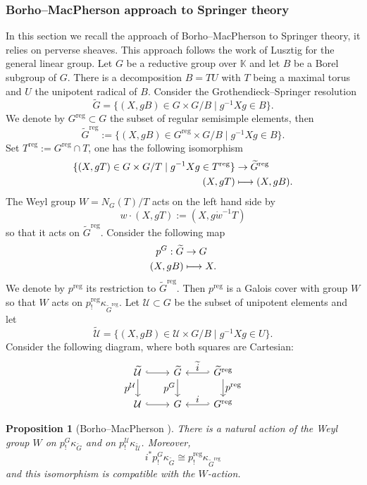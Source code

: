 \documentclass[JEP,XML,SOM,NoEqCountersInSection,Unicode,published]{cedram}
\let\ts\textstyle
\newcommand\mto{\mathchoice{\longmapsto}{\mapsto}{\mapsto}{\mapsto}}
\theoremstyle{definition}
\theoremstyle{plain}
\newtheorem{proposition}[definition]{Proposition}
\DeclareMathOperator{\reg}{reg}
\newcommand{\map}[5]{%
\begin{split}
#1: #2 & \to #3 \\
#4 & \mto #5
\end{split}%
}
\newcommand\KK{\mathbb K }
\newcommand{\inv}{^{-1}}
\begin{document}
\subsubsection{Borho--MacPherson approach to Springer theory}\label{subsect_springer_BM}
In this section we recall the approach of Borho--MacPherson \cite{Borho_MacPherson} to Springer theory, it relies on perverse sheaves. This approach follows the work of Lusztig \cite{Lusztig81} for the general linear group. Let $G$ be a reductive group over $\KK$ and let $B$ be a Borel subgroup of $G$. There is a decomposition $B=T U$ with $T$ being a maximal torus and $U$ the unipotent radical of $B$. Consider the Grothendieck--Springer resolution
\[
\widetilde{G}=\lbrace (X,g B)\in G \times G/B \mid g\inv X g\in B\rbrace.
\]
We denote by $G^{\reg}\subset G$ the subset of regular semisimple elements, then
\[
\widetilde{G}^{\reg}:=\lbrace (X,g B)\in G^{\reg} \times G/B \mid g\inv X g\in B\rbrace.
\]
Set $T^{\reg}:=G^{\reg}\cap T$, one has the following isomorphism
\[
\begin{split}
\lbrace (X,g T)\in G\times G/T \mid g\inv X g \in T^{\reg}\rbrace& \to\widetilde{G}^{\reg} \\
(X,g T) & \mto (X, g B).
\end{split}
\]
The Weyl group $W=N_G(T)/T$ acts on the left hand side by
\[
w\cdot(X,g T) := (X, g \Dot{w}\inv T)
\]
so that it acts on $\widetilde{G}^{\reg}$.
Consider the following map
\[
\map{p^G}{\widetilde{G}}{G}{(X,g B)}{X.}
\]
We denote by $p^{\reg}$ its restriction to $\widetilde{G}^{\reg}$. Then $p^{\reg}$ is a Galois cover with group $W$ so that $W$ acts on $p^{\reg}_!\kappa_{\widetilde{G}^{\reg}}$.
Let $\mathcal{U}\subset G$ be the subset of unipotent elements and let
\[
\widetilde{\mathcal{U}}=\lbrace (X,g B)\in \mathcal{U} \times G/B \mid g\inv X g\in U\rbrace.
\]
Consider the following diagram, where both squares are Cartesian:
\[
\begin{tikzcd}
\widetilde{\mathcal{U}} \arrow[r,hookrightarrow] \arrow[d,"\ts p^{\mathcal{U}}",swap] & \widetilde{G} \arrow[d,"\ts p^G",swap] \arrow[r,hookleftarrow,"\ts\widetilde{i}"] & \widetilde{G}^{\reg} \arrow[d,"\ts p^{\reg}"] \\
\mathcal{U} \arrow[r,hookrightarrow] & G \arrow[r,hookleftarrow,"\ts i"] & G^{\reg}
\end{tikzcd}
\]

\begin{proposition}[Borho--MacPherson {\cite[2.6]{Borho_MacPherson}}]
There is a natural action of the Weyl group $W$ on $p^G_! \kappa_{\widetilde{G}}$ and on $p^{\mathcal{U}}_! \kappa_{\widetilde{\mathcal{U}}}$. Moreover,
\[
i^* p^G_! \kappa_{\widetilde{G}} \cong p^{\reg}_!\kappa_{\widetilde{G}^{\reg}}
\]
and this isomorphism is compatible with the $W$-action.
\end{proposition}
\end{document}
